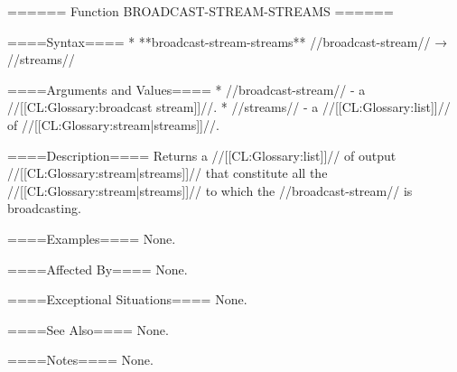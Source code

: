====== Function BROADCAST-STREAM-STREAMS ======

====Syntax====
  * **broadcast-stream-streams** //broadcast-stream// → //streams//

====Arguments and Values====
  * //broadcast-stream// - a //[[CL:Glossary:broadcast stream]]//.
  * //streams// - a //[[CL:Glossary:list]]// of //[[CL:Glossary:stream|streams]]//.

====Description====
Returns a //[[CL:Glossary:list]]// of output //[[CL:Glossary:stream|streams]]// that constitute all the //[[CL:Glossary:stream|streams]]// to which the //broadcast-stream// is broadcasting.

====Examples====
None.

====Affected By====
None.

====Exceptional Situations====
None.

====See Also====
None.

====Notes====
None.

